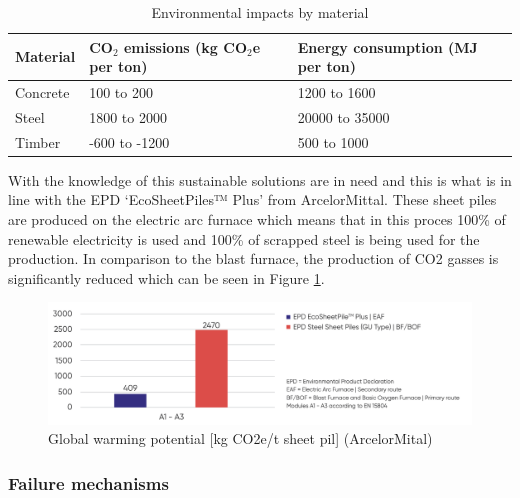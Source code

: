 \begin{table}[ht]
  \centering
  \caption{Environmental impacts by material}
  \label{tab:env_impacts}
  \small
  \setlength{\tabcolsep}{6pt}
  \renewcommand{\arraystretch}{1.15}
  \begin{tabularx}{\linewidth}{@{}l l l@{}}
    \toprule
    \textbf{Material} &
    \textbf{CO$_2$ emissions (kg CO$_2$e per ton)} &
    \textbf{Energy consumption (MJ per ton)} \\
    \midrule
    Concrete & 100 to 200 & 1200 to 1600 \\
    Steel    & 1800 to 2000 & 20000 to 35000 \\
    Timber   & -600 to -1200 & 500 to 1000 \\
    \bottomrule
  \end{tabularx}
\end{table}

With the knowledge of this sustainable solutions are in need and this is what is in line with the EPD ‘EcoSheetPiles™ Plus’ from ArcelorMittal. These sheet piles are produced on the electric arc furnace which means that in this proces 100\% of renewable electricity is used and 100\% of scrapped steel is being used for the production. In comparison to the blast furnace, the production of CO2 gasses is significantly reduced which can be seen in Figure \ref{fig:eaf_bof}.

\begin{figure}[H]
    \centering
    \includegraphics[width=0.70\linewidth]{figures/ch8/eaf_bof.png}
    \caption{Global warming potential [kg CO2e/t sheet pil] (ArcelorMital)}
    \label{fig:eaf_bof}
\end{figure}




\subsubsection{Failure mechanisms}

